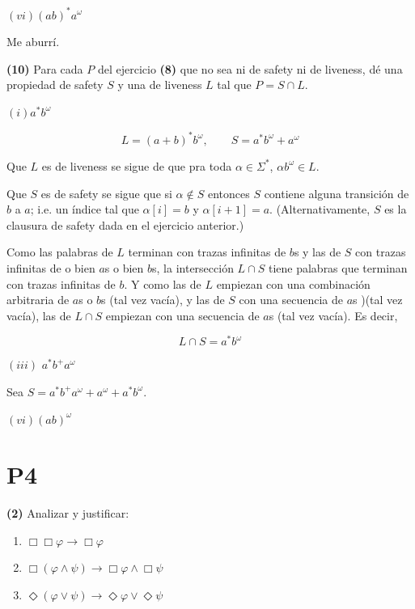 \documentclass[a4paper, 12pt]{article}
\begin{document}
$(vi) (ab)^* a^\omega$

Me aburrí.

\pagebreak 

\begin{myframe}
    \textbf{(10)} Para cada $P$ del ejercicio \textbf{(8)} que no sea ni de
    safety ni de liveness, dé una propiedad de safety $S$ y una de liveness $L$
    tal que $P = S \cap L$.
\end{myframe}

$(i) a^* b^\omega$

\begin{equation*}
L = (a+b)^* b^\omega, \qquad S = a^*b^\omega + a^\omega
\end{equation*}

Que $L$ es de liveness se sigue de que pra toda $\alpha \in \Sigma^*$, $\alpha
b^\omega \in L$.

Que $S$ es de safety se sigue que si $\alpha \not\in S$ entonces $S$ contiene 
alguna transición de $b$ a $a$; i.e. un índice tal que $\alpha[i] = b$
y $\alpha[i+1] = a$. (Alternativamente, $S$ es la clausura de safety dada en el
ejercicio anterior.)

Como las palabras de $L$ terminan con trazas infinitas de $b$s y las de $S$ con
trazas infinitas de o bien $a$s o bien $b$s, la intersección $L \cap S$ tiene
palabras que terminan con trazas infinitas de $b$. Y como las de $L$ empiezan con
una combinación arbitraria de $a$s o $b$s (tal vez vacía), y las de $S$ con una
secuencia de $a$s )(tal vez vacía), las de $L \cap S$ empiezan con una secuencia
de $a$s (tal vez vacía). Es decir, 

\begin{equation*}
    L \cap S = a^* b^\omega
\end{equation*}



$(i i i)$ $a^* b^+ a^\omega$

Sea $S = a^*b^+ a^\omega + a^\omega + a^*b^\omega$.


$(v i) (ab)^\omega$

\pagebreak 

\section*{P4}

\begin{myframe}
    \textbf{(2)} Analizar y justificar: 

    \begin{enumerate}
        \item $\Box \Box \varphi \to \Box \varphi$
        \item $\Box (\varphi \land \psi) \to \Box \varphi \land  \Box \psi$
        \item $\Diamond (\varphi \lor \psi) \to \Diamond \varphi \lor  \Diamond
            \psi$
    \end{enumerate}
\end{myframe}
\end{document}
